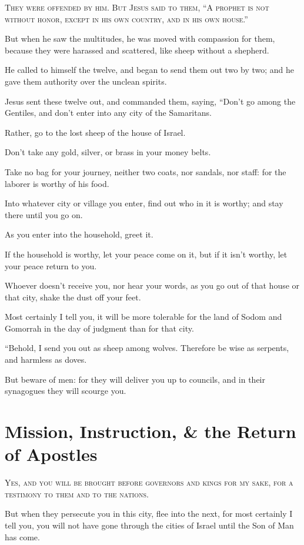 \lettrine{T}{hey were offended by him. But Jesus said to them, “A prophet is not without honor, except in his own country, and in his own house.”}

But when he saw the multitudes, he was moved with compassion for them, because they were harassed and scattered, like sheep without a shepherd.

He called to himself the twelve, and began to send them out two by two; and he gave them authority over the unclean spirits.

Jesus sent these twelve out, and commanded them, saying, “Don’t go among the Gentiles, and don’t enter into any city of the Samaritans.

Rather, go to the lost sheep of the house of Israel.

Don’t take any gold, silver, or brass in your money belts.

Take no bag for your journey, neither two coats, nor sandals, nor staff: for the laborer is worthy of his food.

Into whatever city or village you enter, find out who in it is worthy; and stay there until you go on.

As you enter into the household, greet it.

If the household is worthy, let your peace come on it, but if it isn’t worthy, let your peace return to you.

Whoever doesn’t receive you, nor hear your words, as you go out of that house or that city, shake the dust off your feet.

Most certainly I tell you, it will be more tolerable for the land of Sodom and Gomorrah in the day of judgment than for that city.

“Behold, I send you out as sheep among wolves. Therefore be wise as serpents, and harmless as doves.

But beware of men: for they will deliver you up to councils, and in their synagogues they will scourge you.


\clearpage \section*{Mission, Instruction, \& the Return of Apostles}

\lettrine{Y}{es, and you will be brought before governors and kings for my sake, for a testimony to them and to the nations.}

But when they persecute you in this city, flee into the next, for most certainly I tell you, you will not have gone through the cities of Israel until the Son of Man has come.

